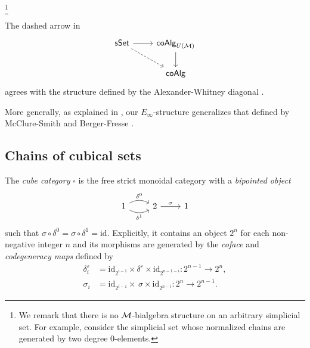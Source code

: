 
\footnote{We remark that there is no $\mathcal{M}$-bialgebra structure on an arbitrary simplicial set.
For example, consider the simplicial set whose normalized chains are generated by two degree 0-elements.}

\begin{remark}
	The dashed arrow in
	\begin{equation*}
	\begin{tikzcd}
	\sSet \arrow[r] \arrow[dr, dashed] & \coAlg_{U(\M)} \arrow[d] \\
	& \coAlg
	\end{tikzcd}
	\end{equation*}
	agrees with the structure defined by the Alexander-Whitney diagonal \cite{bibid}.
	
	More generally, as explained in \cite{Medina20prop1}, our $E_\infty$-structure generalizes that defined by McClure-Smith \cite{mcclure03cochain} and Berger-Fresse \cite{berger04combinatorial}.
\end{remark}

\subsection{Chains of cubical sets}

The \textit{cube category} $\square$ is the free strict monoidal category with a \textit{bipointed object}
\begin{equation*}
\begin{tikzcd}
1 \arrow[r, bend left, "\delta^0"] \arrow[r, bend right, "\delta^1"'] & 2 \arrow[r, "\sigma"] & 1
\end{tikzcd}
\end{equation*}
such that $\sigma \circ \delta^0 = \sigma \circ \delta^1 = \mathrm{id}$. Explicitly, it contains an object $2^n$ for each non-negative integer $n$ and its morphisms are generated by the \textit{coface} and \textit{codegeneracy maps} defined by
\begin{align*}
\delta_i^\varepsilon & = \mathrm{id}_{2^{i-1}} \times \delta^\varepsilon \times \mathrm{id}_{2^{n-1-i}} \colon 2^{n-1} \to 2^n, \\
\sigma_i & = \mathrm{id}_{2^{i-1}} \times \, \sigma \times \mathrm{id}_{2^{n-i}} \colon 2^{n} \to 2^{n-1}.
\end{align*}

